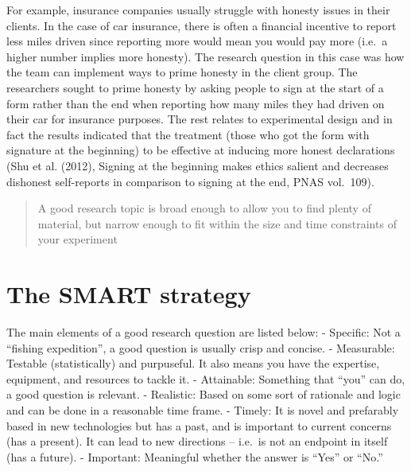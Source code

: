 \documentclass[openany]{book}
\begin{document}
For example, insurance companies usually struggle with honesty issues in their clients. In the case of car insurance, there is often a financial incentive to report less miles driven since reporting more would mean you would pay more (i.e.~a higher number implies more honesty). The research question in this case was how the team can implement ways to prime honesty in the client group. The researchers sought to prime honesty by asking people to sign at the start of a form rather than the end when reporting how many miles they had driven on their car for insurance purposes.
The rest relates to experimental design and in fact the results indicated that the treatment (those who got the form with signature at the beginning) to be effective at inducing more honest declarations (Shu et al. (2012), Signing at the beginning makes ethics salient and decreases dishonest self-reports in comparison to signing at the end, PNAS vol.~109).

\begin{quote}
A good research topic is broad enough to allow you to find plenty of material, but narrow enough to fit within the size and time constraints of your experiment
\end{quote}

\hypertarget{the-smart-strategy}{%
\section{The SMART strategy}\label{the-smart-strategy}}

The main elements of a good research question are listed below:
- Specific: Not a ``fishing expedition'', a good question is usually crisp and concise.
- Measurable: Testable (statistically) and purpuseful. It also means you have the expertise, equipment, and resources to tackle it.
- Attainable: Something that ``you'' can do, a good question is relevant.
- Realistic: Based on some sort of rationale and logic and can be done in a reasonable time frame.
- Timely: It is novel and prefarably based in new technologies but has a past, and is important to current concerns (has a present). It can lead to new directions -- i.e.~is not an endpoint in itself (has a future).
- Important: Meaningful whether the answer is ``Yes'' or ``No.''
\end{document}
